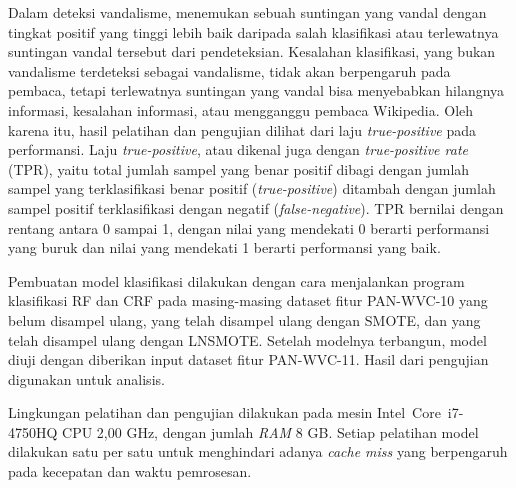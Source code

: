 Dalam deteksi vandalisme, menemukan sebuah suntingan yang vandal dengan tingkat
positif yang tinggi lebih baik daripada salah klasifikasi atau terlewatnya
suntingan vandal tersebut dari pendeteksian.
Kesalahan klasifikasi, yang bukan vandalisme terdeteksi sebagai vandalisme,
tidak akan berpengaruh pada pembaca, tetapi terlewatnya suntingan yang vandal
bisa menyebabkan hilangnya informasi, kesalahan informasi, atau mengganggu
pembaca Wikipedia.
Oleh karena itu, hasil pelatihan dan pengujian dilihat dari laju
\textit{true-positive} pada performansi.
Laju \textit{true-positive}, atau dikenal juga dengan
\textit{true-positive rate} (TPR),
yaitu total jumlah sampel yang benar positif dibagi dengan
jumlah sampel yang terklasifikasi benar positif (\textit{true-positive})
ditambah dengan jumlah sampel positif terklasifikasi dengan negatif
(\textit{false-negative}).
TPR bernilai dengan rentang antara 0 sampai 1, dengan nilai yang mendekati 0
berarti performansi yang buruk dan nilai yang mendekati 1 berarti performansi
yang baik.

Pembuatan model klasifikasi dilakukan dengan cara menjalankan program
klasifikasi RF dan CRF pada masing-masing dataset fitur PAN-WVC-10 yang belum
disampel ulang, yang telah disampel ulang dengan SMOTE, dan yang telah disampel
ulang dengan LNSMOTE.
Setelah modelnya terbangun, model diuji dengan diberikan input dataset fitur
PAN-WVC-11. Hasil dari pengujian digunakan untuk analisis.

Lingkungan pelatihan dan pengujian dilakukan pada mesin Intel\textregistered\
 Core\texttrademark \ i7-4750HQ CPU 2,00 GHz, dengan jumlah \textit{RAM} 8
GB. Setiap pelatihan model dilakukan satu per satu untuk menghindari adanya
\textit{cache miss} yang berpengaruh pada kecepatan dan waktu pemrosesan.
